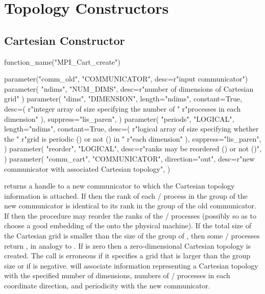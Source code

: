 \section{Topology Constructors}
\label{subsec:topol-construct}

\subsection{Cartesian Constructor}
\label{subsec:topol-cartesian-constructor}

\begin{mpi-binding}
    function_name("MPI_Cart_create")
    
    parameter("comm_old", "COMMUNICATOR", desc=r"input communicator")
    parameter(
        "ndims", "NUM_DIMS", desc=r"number of dimensions of Cartesian grid"
    )
    parameter(
        "dims",
        "DIMENSION",
        length="ndims",
        constant=True,
        desc=(
            r"integer array of size  specifying the number of "
            r"processes in each dimension"
        ),
        suppress="lis_paren",
    )
    parameter(
        "periods",
        "LOGICAL",
        length="ndims",
        constant=True,
        desc=(
            r"logical array of size  specifying whether the "
            r"grid is periodic () or not () in "
            r"each dimension"
        ),
        suppress="lis_paren",
    )
    parameter(
        "reorder",
        "LOGICAL",
        desc=r"ranks may be reordered () or not ()",
    )
    parameter(
        "comm_cart",
        "COMMUNICATOR",
        direction="out",
        desc=r"new communicator with associated Cartesian topology",
    )
\end{mpi-binding}

 returns a handle to a new communicator to which the
Cartesian topology information is attached.  If  then
the rank of each \MPI/ process in the group of the new communicator is identical
to its rank in the group of the old communicator.  If 
then the procedure may reorder the ranks of the \MPI/ processes (possibly so as to
choose a good embedding of the  onto the physical machine).
If the total size of the Cartesian grid is smaller than the size of the group
of , then some \MPI/ processes return , in
analogy to .
If  is zero then a zero-dimensional Cartesian topology is created. The
call is erroneous if it specifies a grid that is larger than the group size or if
 is negative.
 will associate information representing a Cartesian topology
with the specified number of dimensions, numbers of \MPI/ processes in each coordinate
direction, and periodicity with the new communicator.

